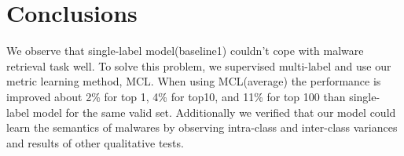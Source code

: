 \section{Conclusions}


We observe that single-label model(baseline1) couldn't cope with malware retrieval task well. 
To solve this problem, we supervised multi-label and use our metric learning method, MCL. 
When using MCL(average) the performance is improved about 2\% for top 1, 4\% for top10, and 11\% for top 100 than single-label model for the same valid set. 
Additionally we verified that our model could learn the semantics of malwares by observing intra-class and inter-class variances and results of other qualitative tests.




\appendix


\begin{acks}
\end{acks}
